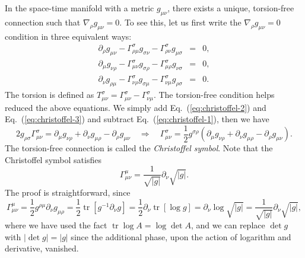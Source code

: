 \documentclass[aps,prb,superscriptaddress,nofootinbib]{revtex4}
\def \tr{\operatorname{tr}}
\begin{document}
In the space-time manifold with a metric $g_{\mu\nu}$, there exists a unique, torsion-free connection such that $\nabla_\rho g_{\mu\nu} = 0$.
To see this, let us first write the $\nabla_\rho g_{\mu\nu} = 0$ condition in three equivalent ways:
\begin{eqnarray}
	\partial_\rho g_{\mu\nu} -\Gamma^\sigma_{\rho\mu}g_{\sigma\nu}-\Gamma^\sigma_{\rho\nu}g_{\mu\sigma} &=& 0, \label{eq:christoffel-1}\\
	\partial_\mu g_{\nu\rho} -\Gamma^\sigma_{\mu\nu}g_{\sigma\rho}-\Gamma^\sigma_{\mu\rho}g_{\nu\sigma} &=& 0, \label{eq:christoffel-2}\\
	\partial_\nu g_{\rho\mu} -\Gamma^\sigma_{\nu\rho}g_{\sigma\mu}-\Gamma^\sigma_{\nu\mu}g_{\rho\sigma} &=& 0. \label{eq:christoffel-3}
\end{eqnarray}
The torsion is defined as $T^\sigma_{\mu\nu} = \Gamma^\sigma_{\mu\nu}-\Gamma^\sigma_{\nu\mu}$.
The torsion-free condition helps reduced the above equations.
We simply add Eq.~(\ref{eq:christoffel-2}) and Eq.~(\ref{eq:christoffel-3}) and subtract Eq.~(\ref{eq:christoffel-1}), then we have
\begin{equation}
	2g_{\rho\sigma} \Gamma^\sigma_{\mu\nu} = \partial_\mu g_{\nu\rho}+\partial_\nu g_{\mu\rho}-\partial_\rho g_{\mu\nu}
	\quad\Longrightarrow\quad
	\Gamma^\sigma_{\mu\nu} = \frac{1}{2}g^{\sigma\rho}(\partial_\mu g_{\nu\rho}+\partial_\nu g_{\mu\rho}-\partial_\rho g_{\mu\nu}).
\end{equation}
The torsion-free connection is called the \textit{Christoffel symbol}.
Note that the Christoffel symbol satisfies
\begin{equation}
	\Gamma^\mu_{\mu\nu} = \frac{1}{\sqrt{|g|}}\partial_\nu \sqrt{|g|}.
\end{equation}
The proof is straightforward, since
\begin{equation*}
	\Gamma^\mu_{\mu\nu} = \frac{1}{2} g^{\rho\mu} \partial_\nu g_{\mu\rho}
	= \frac{1}{2}\tr[g^{-1}\partial_\nu g]
	= \frac{1}{2}\partial_\nu \tr[\log g]
	= \partial_\nu \log \sqrt{|g|}
	= \frac{1}{\sqrt{|g|}}\partial_\nu \sqrt{|g|},
\end{equation*}
where we have used the fact $\tr \log A = \log \det A$, and we can replace $\det g$ with $|\det g| = |g|$ since the additional phase, upon the action of logarithm and derivative, vanished.
\end{document}

